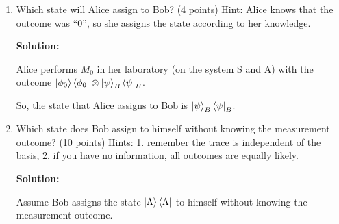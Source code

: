 \documentclass[12pt]{article}
\begin{document}
\begin{enumerate}


    \item Which state will Alice assign to Bob? (4 points) Hint: Alice knows that the outcome was “0”, so she assigns the state according to her knowledge.



          \textbf{Solution:}

          Alice performs $M_0$ in her laboratory (on the system S and A) with the outcome $\ket{\phi_0}\bra{\phi_0}\otimes \ket{\psi}_B\bra{\psi}_B$.

          So, the state that Alice assigns to Bob is $\ket{\psi}_B\bra{\psi}_B$.


    \item Which state does Bob assign to himself without knowing the measurement outcome? (10 points) Hints: 1. remember the trace is independent of the basis, 2. if you have no information, all outcomes are equally likely.

          \textbf{Solution:}


          Assume Bob assigns the state $\ket{\Lambda}\bra{\Lambda}$ to himself without knowing the measurement outcome.


\end{enumerate}
\end{document}
